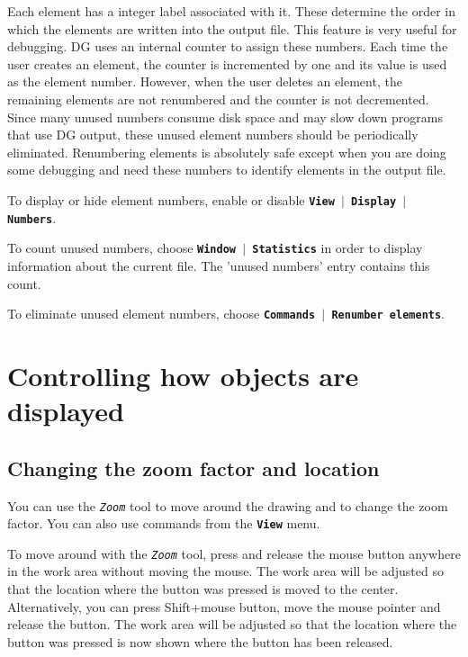 \documentclass[12pt]{report}
\begin{document}
Each element has a integer label associated with it. These
determine the order in which the elements are written 
into the output file. This
feature is very useful for debugging. DG uses an internal counter to
assign these numbers. Each time the user creates an element, the
counter is incremented by one and its value is used as the element
number. However, when the user deletes an element, the remaining elements are
not renumbered and the counter is not decremented. Since many unused
numbers consume disk space and may slow down programs that use DG
output, these unused element numbers should be periodically eliminated.
Renumbering elements is
absolutely safe except when you are doing some debugging and need these
numbers to identify elements in the output file.

To display or hide element numbers, enable or disable
\textbf{\texttt{View  \begin{math}\vert{}\end{math}  Display  \begin{math}\vert{}\end{math}  Numbers}}.

To count unused numbers, choose
\textbf{\texttt{Window  \begin{math}\vert{}\end{math}  Statistics}} in order
to display information about the current file. The 'unused numbers'
entry contains this count.

To eliminate unused element numbers, choose
\textbf{\texttt{Commands  \begin{math}\vert{}\end{math}  Renumber
elements}}.

\chapter{Controlling how objects are displayed}

\section{Changing the zoom factor and location}

You can use the \textit{\texttt{Zoom}} tool to move around the drawing
and to change the zoom factor. You can also use commands from the
\textbf{\texttt{View}} menu.

To move around with the \textit{\texttt{Zoom}} tool, press and release
the mouse button anywhere in the work area without moving the mouse.
The work area will be adjusted so that the location where the button
was pressed is moved to the center. Alternatively, you can press
Shift+mouse button, move the mouse pointer and release the button. The
work area will be adjusted so that the location where the button was
pressed is now shown where the button has been released.
\end{document}
